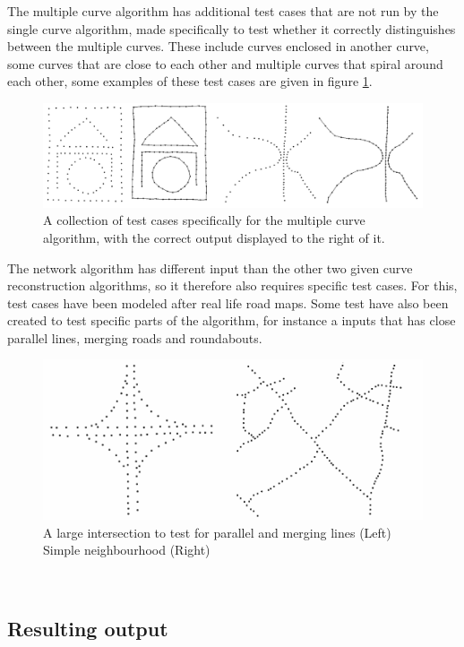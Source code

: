 \documentclass[11pt]{article}
\begin{document}
The multiple curve algorithm has additional test cases that are not run by the single curve algorithm, made specifically to test whether it correctly distinguishes between the multiple curves. These include curves enclosed in another curve, some curves that are close to each other and multiple curves that spiral around each other, some examples of these test cases are given in figure \ref{multi}.

\begin{figure}[ht!]
\centering
\includegraphics[scale=0.3]{multiInput.png}
\caption{A collection of test cases specifically for the multiple curve algorithm, with the correct output displayed to the right of it.}
\label{multi}
\end{figure}

The network algorithm has different input than the other two given curve reconstruction algorithms, so it therefore also requires specific test cases. For this, test cases have been modeled after real life road maps. Some test have also been created to test specific parts of the algorithm, for instance a inputs that has close parallel lines, merging roads and roundabouts.

\begin{figure}[ht!]
\centering
\includegraphics[scale=0.3]{networkInput.png}
\caption{A large intersection to test for parallel and merging lines (Left) Simple neighbourhood (Right)}
\label{network}
\end{figure}$ $\\

\subsection{Resulting output}
\end{document}
